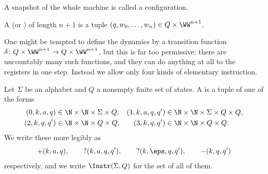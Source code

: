 \begin{center}
\end{center}

A snapshot of the whole machine is called a configuration.

\begin{definition}[Configuration]
	A  (or ) of length $n+1$ is a tuple $(q, w_0, \dots, w_n) \in Q \times \WW^{n+1}$.
\end{definition}

One might be tempted to define the dynamics by a transition function $\delta \colon Q \times \WW^{n+1} \to Q \times \WW^{n+1}$, but this is far too permissive: there are uncountably many such functions, and they can do anything at all to the registers in one step. Instead we allow only four kinds of elementary instruction.

\begin{definition}[Instruction]
	Let $\Sigma$ be an alphabet and $Q$ a nonempty finite set of states. A  is a tuple of one of the forms
	\begin{align*}
		(0,k,a,q) &\in \N\times\N\times\Sigma\times Q, &  (1,k,a,q,q') &\in \N\times\N\times\Sigma\times Q\times Q, \\
		(2,k,q,q') &\in \N\times\N\times Q\times Q, & (3,k,q,q') &\in \N\times\N\times Q\times Q.
	\end{align*}
	We write these more legibly as
	$$+(k,a,q), \qquad ?(k,a,q,q'), \qquad ?(k,\eps,q,q'), \qquad -(k,q,q')$$
	respectively, and we write $\Instr(\Sigma,Q)$ for the set of all of them.
\end{definition}

